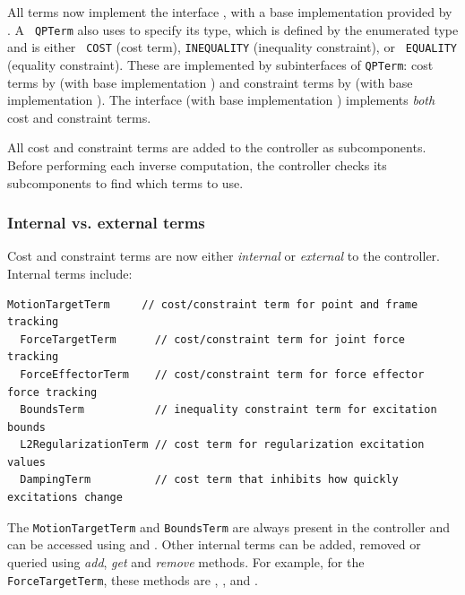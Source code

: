 \documentclass{article}
\begin{document}
All terms now implement the interface
, with a base implementation
provided by .  A {\tt
QPTerm} also uses
 to specify its
type, which is defined by the enumerated type
 and is either {\tt
COST} (cost term), {\tt INEQUALITY} (inequality constraint), or {\tt
EQUALITY} (equality constraint). These are implemented by
subinterfaces of {\tt QPTerm}: cost terms by
 (with base
implementation )
and constraint terms by
 (with base
implementation
).  The
interface  (with
base implementation
) implements
{\it both} cost and constraint terms.

All cost and constraint terms are added to the controller as
subcomponents. Before performing each inverse computation, the
controller checks its subcomponents to find which terms to use.

\subsubsection*{Internal vs. external terms}

Cost and constraint terms are now either {\it internal} or {\it
external} to the controller. Internal terms include:
%
\begin{lstlisting}[]
  MotionTargetTerm     // cost/constraint term for point and frame tracking
  ForceTargetTerm      // cost/constraint term for joint force tracking
  ForceEffectorTerm    // cost/constraint term for force effector force tracking
  BoundsTerm           // inequality constraint term for excitation bounds
  L2RegularizationTerm // cost term for regularization excitation values
  DampingTerm          // cost term that inhibits how quickly excitations change
\end{lstlisting}
%
The {\tt MotionTargetTerm} and {\tt BoundsTerm} are always present in
the controller and can be accessed using
and
.
Other internal terms can be added, removed or queried using {\it add},
{\it get} and {\it remove} methods. For example, for the 
{\tt ForceTargetTerm}, these methods are 
,
,
and
.
\end{document}
